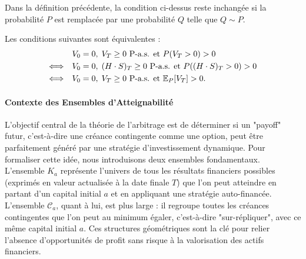 \begin{remarques}
\item[(a)] Dans la définition précédente, la condition ci-dessus reste inchangée si la probabilité $P$ est remplacée par une probabilité $Q$ telle que $Q \sim P$.
\item[(b)] Les conditions suivantes sont équivalentes :
\begin{align}
& V_0 = 0, \; V_T \ge 0 \text{ P-a.s. et } P(V_T > 0) > 0 \\
\Longleftrightarrow \quad & V_0 = 0, \; (H \cdot S)_T \ge 0 \text{ P-a.s. et } P((H \cdot S)_T > 0) > 0 \\
\Longleftrightarrow \quad & V_0 = 0, \; V_T \ge 0 \text{ P-a.s. et } \mathbb{E}_P[V_T] > 0.
\end{align}
\end{remarques}

\paragraph*{Contexte des Ensembles d'Atteignabilité}
L'objectif central de la théorie de l'arbitrage est de déterminer si un "payoff" futur, c'est-à-dire une créance contingente comme une option, peut être parfaitement généré par une stratégie d'investissement dynamique. Pour formaliser cette idée, nous introduisons deux ensembles fondamentaux. L'ensemble $K_a$ représente l'univers de tous les résultats financiers possibles (exprimés en valeur actualisée à la date finale $T$) que l'on peut atteindre en partant d'un capital initial $a$ et en appliquant une stratégie auto-financée. L'ensemble $\mathcal{C}_a$, quant à lui, est plus large : il regroupe toutes les créances contingentes que l'on peut au minimum égaler, c'est-à-dire "sur-répliquer", avec ce même capital initial $a$. Ces structures géométriques sont la clé pour relier l'absence d'opportunités de profit sans risque à la valorisation des actifs financiers.

